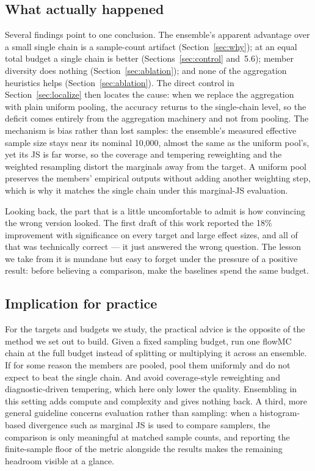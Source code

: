 \documentclass[11pt]{article}
\begin{document}
\subsection{What actually happened}
Several findings point to one conclusion. The ensemble's apparent advantage
over a small single chain is a sample-count artifact (Section~\ref{sec:why});
at an equal total budget a single chain is better
(Sections~\ref{sec:control} and~5.6); member diversity does nothing
(Section~\ref{sec:ablation}); and none of the aggregation heuristics helps
(Section~\ref{sec:ablation}). The direct control in
Section~\ref{sec:localize} then locates the cause: when we replace the
aggregation with plain uniform pooling, the accuracy returns to the
single-chain level, so the deficit comes entirely from the aggregation
machinery and not from pooling. The mechanism is bias rather than lost samples: the ensemble's measured
effective sample size stays near its nominal 10,000, almost the same as the
uniform pool's, yet its JS is far worse, so the coverage and tempering
reweighting and the weighted resampling distort the marginals away from the
target. A uniform pool preserves the members' empirical outputs without adding another
weighting step, which is why it matches the single chain under this marginal-JS
evaluation.

Looking back, the part that is a little uncomfortable to admit is how
convincing the wrong version looked. The first draft of this work reported the
18\% improvement with significance on every target and large effect sizes, and
all of that was technically correct --- it just answered the wrong question.
The lesson we take from it is mundane but easy to forget under the pressure of
a positive result: before believing a comparison, make the baselines spend the
same budget.

\subsection{Implication for practice}
For the targets and budgets we study, the practical advice is the opposite of
the method we set out to build. Given a fixed sampling budget, run one flowMC
chain at the full budget instead of splitting or multiplying it across an
ensemble. If for some reason the members are pooled, pool them uniformly and do
not expect to beat the single chain. And avoid coverage-style reweighting and
diagnostic-driven tempering, which here only lower the quality. Ensembling in
this setting adds compute and complexity and gives nothing back. A third,
more general guideline concerns evaluation rather than sampling: when a
histogram-based divergence such as marginal JS is used to compare samplers,
the comparison is only meaningful at matched sample counts, and reporting the
finite-sample floor of the metric alongside the results makes the remaining
headroom visible at a glance.
\end{document}
